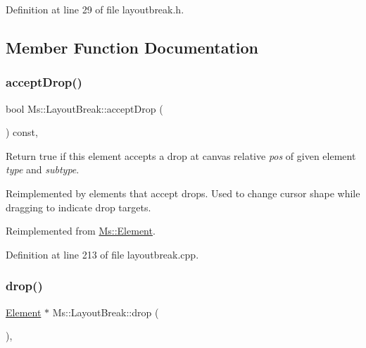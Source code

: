 Definition at line 29 of file layoutbreak.\+h.



\subsection{Member Function Documentation}
\mbox{\label{class_ms_1_1_layout_break_a69134cfdef22b53fdbb0e14a5c8705d8}} 
\subsubsection{\texorpdfstring{accept\+Drop()}{acceptDrop()}}
{\footnotesize\ttfamily bool Ms\+::\+Layout\+Break\+::accept\+Drop (\begin{DoxyParamCaption}\item[{\hyperlink{class_ms_1_1_edit_data}{Edit\+Data} \&}]{ }\end{DoxyParamCaption}) const\hspace{0.3cm}{\ttfamily [override]}, {\ttfamily [virtual]}}

Return true if this element accepts a drop at canvas relative {\itshape pos} of given element {\itshape type} and {\itshape subtype}.

Reimplemented by elements that accept drops. Used to change cursor shape while dragging to indicate drop targets. 

Reimplemented from \hyperlink{class_ms_1_1_element_a35614445f0bc2212cbcc75c3f5810543}{Ms\+::\+Element}.



Definition at line 213 of file layoutbreak.\+cpp.

\mbox{\label{class_ms_1_1_layout_break_a6baf8d925ef42d68aa8a3c9df9d694d6}} 
\subsubsection{\texorpdfstring{drop()}{drop()}}
{\footnotesize\ttfamily \hyperlink{class_ms_1_1_element}{Element} $\ast$ Ms\+::\+Layout\+Break\+::drop (\begin{DoxyParamCaption}\item[{\hyperlink{class_ms_1_1_edit_data}{Edit\+Data} \&}]{ }\end{DoxyParamCaption})\hspace{0.3cm}{\ttfamily [override]}, {\ttfamily [virtual]}}

